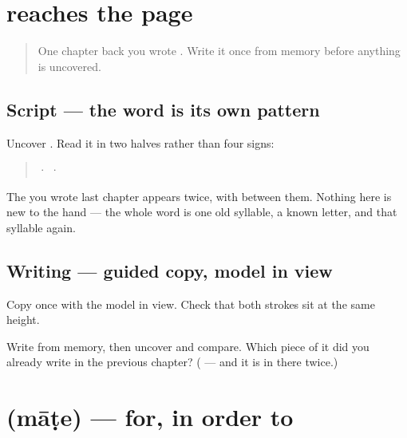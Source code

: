 \section[\texorpdfstring{\gu{કેમકે} (kemke)}{કેમકે (kemke)}]{ reaches the page}

\label{lesson:GU-C34-kemke-write}



\begin{quote}
One chapter back you wrote \textbf{}. Write it once from memory before anything is uncovered.
\end{quote}

\subsection*{Script — the word is its own pattern}
Uncover \textbf{}. Read it in two halves rather than four signs:

\begin{quote}
\textbf{} · \textbf{} · \textbf{}
\end{quote}

The \textbf{} you wrote last chapter appears twice, with \textbf{} between them. Nothing here is new to the hand — the whole word is one old syllable, a known letter, and that syllable again.

\subsection*{Writing — guided copy, model in view}

Copy \textbf{} once with the model in view. Check that both \textbf{} strokes sit at the same height.

\begin{tcolorbox}[breakable,colback=teal!4,colframe=teal!35!black,title={Before you move on}]
Write \textbf{} from memory, then uncover and compare. Which piece of it did you already write in the previous chapter? (\textbf{} — and it is in there twice.)
\end{tcolorbox}
\section[\texorpdfstring{\gu{માટે} (māṭe)}{માટે (māṭe)}]{ (māṭe) — for, in order to}

